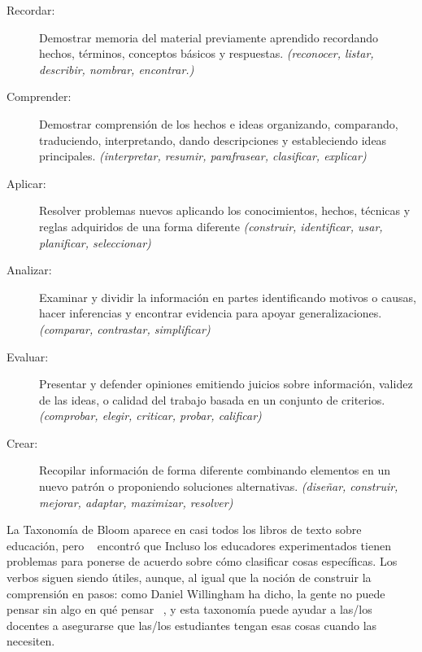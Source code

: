 \begin{description}
 
\item[Recordar:]
  Demostrar memoria del  material previamente aprendido
recordando hechos, términos,
conceptos básicos y respuestas.
  \emph{(reconocer, listar, describir, nombrar, encontrar.)}
 
\item[Comprender:]
  Demostrar comprensión de los hechos e ideas
organizando, comparando, traduciendo, interpretando, dando descripciones y estableciendo ideas principales.
  \emph{(interpretar, resumir, parafrasear, clasificar, explicar)}
 
\item[Aplicar:]
  Resolver problemas nuevos aplicando los conocimientos,
hechos, técnicas y reglas adquiridos de una forma diferente
  \emph{(construir, identificar, usar, planificar, seleccionar)}
 
\item[Analizar:]
  Examinar y dividir la información en partes identificando motivos o causas,
  hacer inferencias y encontrar evidencia para apoyar generalizaciones.
  \emph{(comparar, contrastar, simplificar)}
 
\item[Evaluar:]
  Presentar y defender opiniones emitiendo juicios sobre información,
  validez de las ideas,
o calidad del trabajo basada en un conjunto de criterios.
  \emph{(comprobar, elegir, criticar, probar, calificar)}
 
\item[Crear:]
 Recopilar información de forma diferente
combinando elementos en un nuevo patrón o proponiendo soluciones alternativas.
  \emph{(diseñar, construir, mejorar, adaptar, maximizar, resolver)}
 
\end{description}
 
La Taxonomía de Bloom aparece en casi todos los libros de texto sobre educación,
pero ~\cite{Masa2018} encontró que
Incluso los educadores experimentados tienen problemas para ponerse de acuerdo
sobre cómo clasificar cosas específicas.
Los verbos siguen siendo útiles,
aunque,
al igual que la noción de construir la comprensión en pasos:
como Daniel Willingham ha dicho, 
la gente no puede pensar sin algo en qué pensar ~\cite{Will2010},
y esta taxonomía puede ayudar a las/los docentes a asegurarse
que las/los estudiantes tengan esas cosas cuando las necesiten.

